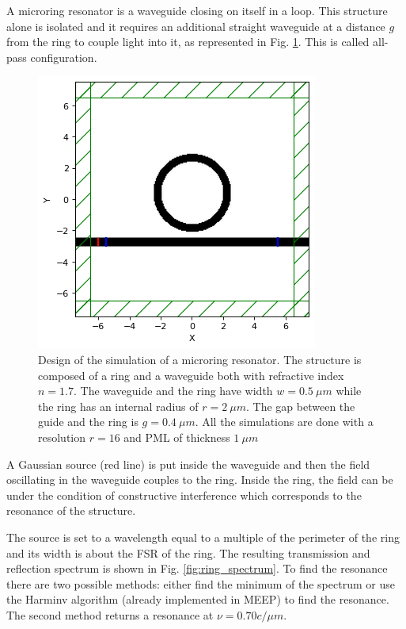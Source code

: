 A microring resonator is a waveguide closing on itself in a loop. This structure alone is isolated and it requires an additional straight waveguide at a distance \(g\) from the ring to couple light into it, as represented in Fig. \ref{fig:ring_design}. This is called all-pass configuration.

\begin{figure}[H]
    \centering
    \includegraphics[width=0.6\linewidth]{Figures/ring_design.png}
    \caption{Design of the simulation of a microring resonator. The structure is composed of a ring and a waveguide both with refractive index \(n=1.7\). The waveguide and the ring have width \(w=0.5\ \mu m\) while the ring has an internal radius of \(r=2\ \mu m\). The gap between the guide and the ring is \(g=0.4\ \mu m\). All the simulations are done with a resolution \(r=16\) and PML of thickness \(1\ \mu m\)}
    \label{fig:ring_design}
\end{figure}

A Gaussian source (red line) is put inside the waveguide and then the field oscillating in the waveguide couples to the ring. Inside the ring, the field can be under the condition of constructive interference which corresponds to the resonance of the structure.

The source is set to a wavelength equal to a multiple of the perimeter of the ring and its width is about the FSR of the ring. The resulting transmission and reflection spectrum is shown in Fig. \ref{fig:ring_spectrum}. To find the resonance there are two possible methods: either find the minimum of the spectrum or use the Harminv algorithm (already implemented in MEEP) to find the resonance. The second method returns a resonance at \(\nu = 0.70 c/\mu m\).

